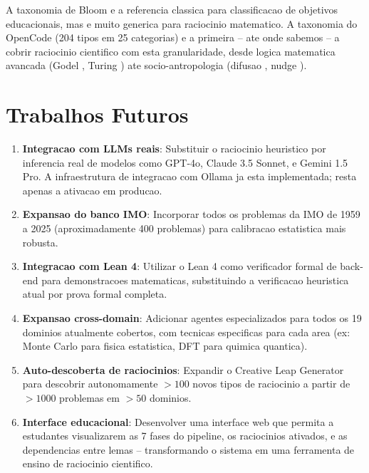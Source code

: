 \documentclass[5p]{elsarticle}
\begin{document}
A taxonomia de Bloom \cite{bloom1956} e a referencia classica para classificacao
de objetivos educacionais, mas e muito generica para raciocinio matematico. A
taxonomia do OpenCode (204 tipos em 25 categorias) e a primeira -- ate onde
sabemos -- a cobrir raciocinio cientifico com esta granularidade, desde logica
matematica avancada (Godel \cite{godel1931}, Turing \cite{turing1936}) ate
socio-antropologia (difusao \cite{granovetter1973}, nudge \cite{thaler2008}).

\section{Trabalhos Futuros}

\begin{enumerate}[label=(\arabic*)]
 \item \textbf{Integracao com LLMs reais}: Substituir o raciocinio heuristico
 por inferencia real de modelos como GPT-4o, Claude 3.5 Sonnet, e Gemini 1.5
 Pro. A infraestrutura de integracao com Ollama \cite{ollama} ja esta
 implementada; resta apenas a ativacao em producao.
 \item \textbf{Expansao do banco IMO}: Incorporar todos os problemas da IMO
 de 1959 a 2025 (aproximadamente 400 problemas) para calibracao estatistica
 mais robusta.
 \item \textbf{Integracao com Lean 4}: Utilizar o Lean 4 \cite{demoura2021}
 como verificador formal de back-end para demonstracoes matematicas,
 substituindo a verificacao heuristica atual por prova formal completa.
 \item \textbf{Expansao cross-domain}: Adicionar agentes especializados para
 todos os 19 dominios atualmente cobertos, com tecnicas especificas para
 cada area (ex: Monte Carlo para fisica estatistica, DFT para quimica
 quantica).
 \item \textbf{Auto-descoberta de raciocinios}: Expandir o Creative Leap
 Generator para descobrir autonomamente $>100$ novos tipos de raciocinio
 a partir de $>1000$ problemas em $>50$ dominios.
 \item \textbf{Interface educacional}: Desenvolver uma interface web que
 permita a estudantes visualizarem as 7 fases do pipeline, os raciocinios
 ativados, e as dependencias entre lemas -- transformando o sistema em uma
 ferramenta de ensino de raciocinio cientifico.
\end{enumerate}
\end{document}
